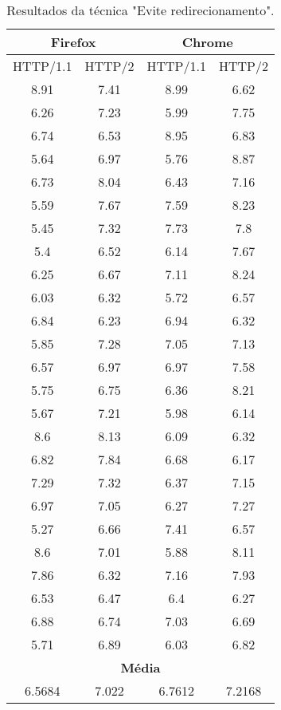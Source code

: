 \begin{table}[H]
	\centering
	\caption{Resultados da técnica "Evite redirecionamento".}
	\label{resultados-redirecionamento}
	\begin{tabular}{cccc}
		\hline
		\multicolumn{2}{c}{\textbf{Firefox}} & \multicolumn{2}{c}{\textbf{Chrome}} \\
		\hline
		HTTP/1.1 & HTTP/2 & HTTP/1.1 & HTTP/2 \\
		\hline
		8.91 & 7.41 & 8.99 & 6.62 \\
		6.26 & 7.23 & 5.99 & 7.75 \\
		6.74 & 6.53 & 8.95 & 6.83 \\
		5.64 & 6.97 & 5.76 & 8.87 \\
		6.73 & 8.04 & 6.43 & 7.16 \\
		5.59 & 7.67 & 7.59 & 8.23 \\
		5.45 & 7.32 & 7.73 & 7.8 \\
		5.4 & 6.52 & 6.14 & 7.67 \\
		6.25 & 6.67 & 7.11 & 8.24 \\
		6.03 & 6.32 & 5.72 & 6.57 \\
		6.84 & 6.23 & 6.94 & 6.32 \\
		5.85 & 7.28 & 7.05 & 7.13 \\
		6.57 & 6.97 & 6.97 & 7.58 \\
		5.75 & 6.75 & 6.36 & 8.21 \\
		5.67 & 7.21 & 5.98 & 6.14 \\ 
		8.6 & 8.13 & 6.09 & 6.32 \\
		6.82 & 7.84 & 6.68 & 6.17 \\
		7.29 & 7.32 & 6.37 & 7.15 \\
		6.97 & 7.05 & 6.27 & 7.27 \\
		5.27 & 6.66 & 7.41 & 6.57 \\
		8.6 & 7.01 & 5.88 & 8.11 \\
		7.86 & 6.32 & 7.16 & 7.93 \\
		6.53 & 6.47 & 6.4 & 6.27 \\
		6.88 & 6.74 & 7.03 & 6.69 \\
		5.71 & 6.89 & 6.03 & 6.82 \\
		\hline
		\multicolumn{4}{c}{\textbf{Média}} \\
		6.5684 & 7.022 & 6.7612 & 7.2168 \\
		\hline
	\end{tabular}
\end{table}